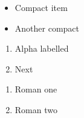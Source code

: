 \documentclass{article}
\begin{document}
\begin{itemize}[noitemsep,topsep=0pt,leftmargin=*]
  \item Compact item
  \item Another compact
\end{itemize}
\begin{enumerate}[label=(\alph*)]
  \item Alpha labelled
  \item Next
\end{enumerate}
\begin{enumerate}[label=\roman*.]
  \item Roman one
  \item Roman two
\end{enumerate}
\end{document}
